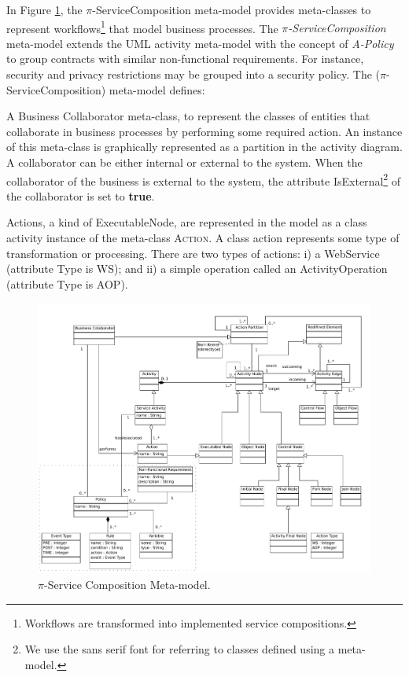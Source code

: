 In Figure \ref{fig:e-scomposition-metamodel}, the $\pi$-Serv\-ice\-Com\-po\-si\-tion meta-model 
provides meta-classes to represent workflows\footnote{Workflows are transformed into implemented service compositions.} that model  business processes.
The \textit{$\pi$-Serv\-ice\-Com\-po\-si\-tion} meta-model extends the UML activity  meta-model with the concept of  \textit{A-Policy}
to group contracts with similar non-functional requirements.
For instance, security and privacy restrictions may be grouped into a security policy.
 The  ($\pi$-Serv\-ice\-Com\-po\-si\-tion) meta-model defines:
\begin{itemizedTrivlist}
\item A {\sc Business Collaborator} meta-class, to represent the classes of entities that collaborate in  business processes by performing some  required action. 
An instance of this meta-class is graphically represented as a partition in the activity diagram. 
A collaborator can be either internal or external to the system. 
When the collaborator of the business is external to the system, the attribute {\sf IsExternal}\footnote{We use the {\sf sans serif} font for referring to classes defined using a meta-model.} of the collaborator is set to \textbf{true}.

\item {\sc Action}s, a kind of {\sc ExecutableNode}, are represented in the model as a class activity instance of the meta-class \textsc{Action}. 
A class action represents some type of transformation or processing. 
There are two types of actions: i) a WebService (attribute Type is {\sf WS}); and ii) a simple operation called an {\sc ActivityOperation} (attribute Type is {\sc AOP}).

\begin{figure}
\centering 
\includegraphics[width=1.0\textwidth]{figs/PiServiceComposition} 
\caption{$\pi$-Service Composition Meta-model.}
\label{fig:e-scomposition-metamodel}
\end{figure}


\end{itemizedTrivlist}

